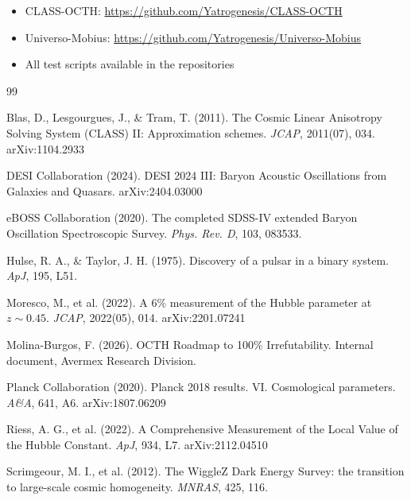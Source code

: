 \documentclass[12pt,a4paper]{article}
\begin{document}
\begin{itemize}
    \item CLASS-OCTH: \url{https://github.com/Yatrogenesis/CLASS-OCTH}
    \item Universo-Mobius: \url{https://github.com/Yatrogenesis/Universo-Mobius}
    \item All test scripts available in the repositories
\end{itemize}


\begin{thebibliography}{99}

Blas, D., Lesgourgues, J., \& Tram, T. (2011).
The Cosmic Linear Anisotropy Solving System (CLASS) II: Approximation schemes.
\textit{JCAP}, 2011(07), 034.
arXiv:1104.2933

DESI Collaboration (2024).
DESI 2024 III: Baryon Acoustic Oscillations from Galaxies and Quasars.
arXiv:2404.03000

eBOSS Collaboration (2020).
The completed SDSS-IV extended Baryon Oscillation Spectroscopic Survey.
\textit{Phys. Rev. D}, 103, 083533.

Hulse, R. A., \& Taylor, J. H. (1975).
Discovery of a pulsar in a binary system.
\textit{ApJ}, 195, L51.

Moresco, M., et al. (2022).
A 6\% measurement of the Hubble parameter at $z \sim 0.45$.
\textit{JCAP}, 2022(05), 014.
arXiv:2201.07241

Molina-Burgos, F. (2026).
OCTH Roadmap to 100\% Irrefutability.
Internal document, Avermex Research Division.

Planck Collaboration (2020).
Planck 2018 results. VI. Cosmological parameters.
\textit{A\&A}, 641, A6.
arXiv:1807.06209

Riess, A. G., et al. (2022).
A Comprehensive Measurement of the Local Value of the Hubble Constant.
\textit{ApJ}, 934, L7.
arXiv:2112.04510

Scrimgeour, M. I., et al. (2012).
The WiggleZ Dark Energy Survey: the transition to large-scale cosmic homogeneity.
\textit{MNRAS}, 425, 116.

\end{thebibliography}
\end{document}
